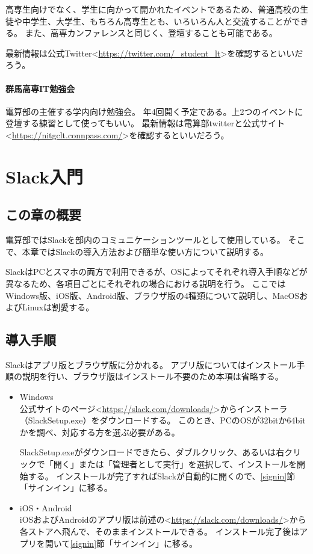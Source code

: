 \documentclass[lualatex,ja=standard,12pt,a4j]{bxjsbook}
\begin{document}
					高専生向けでなく、学生に向かって開かれたイベントであるため、普通高校の生徒や中学生、大学生、もちろん高専生とも、いろいろん人と交流することができる。
					また、高専カンファレンスと同じく、登壇することも可能である。
					
					最新情報は公式Twitter<\url{https://twitter.com/_student_lt}>を確認するといいだろう。
				\subsubsection{群馬高専IT勉強会}
					電算部の主催する学内向け勉強会。
					年4回開く予定である。上2つのイベントに登壇する練習として使ってもいい。
					最新情報は電算部twitterと公式サイト<\url{https://nitgclt.connpass.com/}>を確認するといいだろう。
	\chapter{Slack入門}
		\section{この章の概要}
			電算部ではSlackを部内のコミュニケーションツールとして使用している。
            そこで、本章ではSlackの導入方法および簡単な使い方について説明する。
            
            SlackはPCとスマホの両方で利用できるが、OSによってそれぞれ導入手順などが異なるため、各項目ごとにそれぞれの場合における説明を行う。
            ここではWindows版、iOS版、Android版、ブラウザ版の4種類について説明し、MacOSおよびLinuxは割愛する。
            
        \section{導入手順}
        	Slackはアプリ版とブラウザ版に分かれる。
            アプリ版についてはインストール手順の説明を行い、ブラウザ版はインストール不要のため本項は省略する。
        	\begin{itemize} 
            	\item Windows\\
                	公式サイトのページ<\url{https://slack.com/downloads/}>からインストーラ（SlackSetup.exe）をダウンロードする。
                    このとき、PCのOSが32bitか64bitかを調べ、対応する方を選ぶ必要がある。
                    
                    SlackSetup.exeがダウンロードできたら、ダブルクリック、あるいは右クリックで「開く」または「管理者として実行」を選択して、インストールを開始する。
                	インストールが完了すればSlackが自動的に開くので、\ref{signin}節「サインイン」に移る。
                    
              	\item iOS・Android\\
                	iOSおよびAndroidのアプリ版は前述の<\url{https://slack.com/downloads/}>から各ストアへ飛んで、そのままインストールできる。
                    インストール完了後はアプリを開いて\ref{signin}節「サインイン」に移る。
                    
            \end{itemize}
\end{document}
